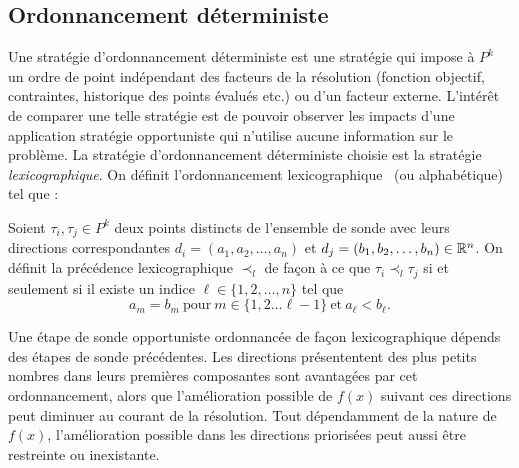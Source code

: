 \subsection{Ordonnancement déterministe}\label{sec:det}
Une stratégie d'ordonnancement déterministe est une stratégie qui impose à $P^k$ un ordre de point indépendant des facteurs de la résolution (fonction objectif, contraintes, historique des points évalués etc.) ou d'un facteur externe. L'intérêt de comparer une telle stratégie est de pouvoir observer les impacts d'une application stratégie opportuniste qui n'utilise aucune information sur le problème. La stratégie d'ordonnancement déterministe choisie est la stratégie \emph{lexicographique}. On définit l'ordonnancement lexicographique~\cite{CoLeRiSt2001b} (ou alphabétique) tel que :
\begin{definition}\label{def:lexico}
	Soient $\tau_i,\tau_j \in P^k$ deux points distincts de l'ensemble de sonde avec leurs directions correspondantes $d_i = (a_1,a_2,\dots,a_n)$ et $d_j = (b_1,b_2,\dots,b_n)\in \mathbb{R}^n$. On définit la précédence  lexicographique $\prec_l$ de façon à ce que $\tau_i \prec_l \tau_j$ si et seulement si il existe un indice $\ell \in \{1,2,\dots,n\}$ tel que $$a_m = b_m~\text{pour}~m\in\{1,2\dots\ell-1\}~\text{et}~a_\ell < b_\ell.$$
\end{definition}
Une étape de sonde opportuniste ordonnancée de façon lexicographique dépends des étapes de sonde précédentes. Les directions présententent des plus petits nombres dans leurs premières composantes sont avantagées par cet ordonnancement, alors que l'amélioration possible de $f(x)$ suivant ces directions peut diminuer au courant de la résolution. Tout dépendamment de la nature de $f(x)$, l'amélioration possible dans les directions priorisées peut aussi être restreinte ou inexistante.
